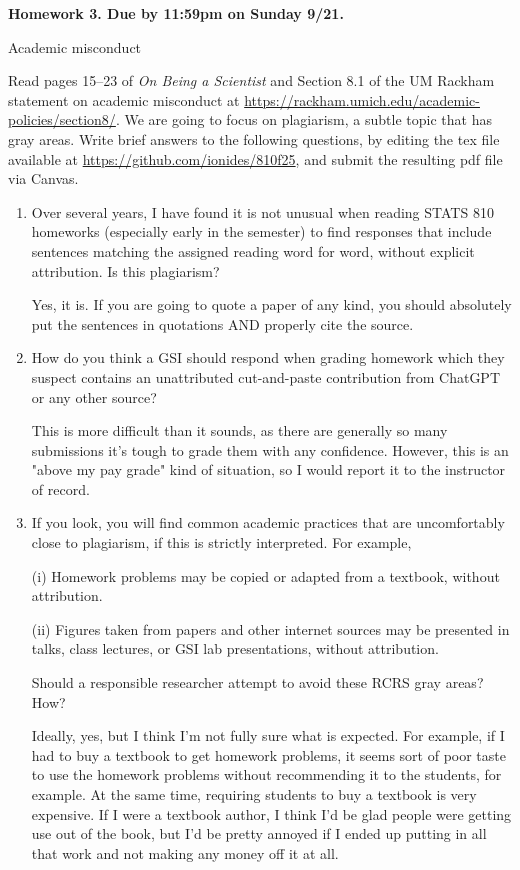 \documentclass[12pt]{article}
\begin{document}
\begin{center}\bf
Homework 3. Due by 11:59pm on Sunday 9/21.

Academic misconduct

\end{center}
Read pages 15--23 of {\em On Being a Scientist} and Section 8.1 of the UM Rackham statement on academic misconduct at \url{https://rackham.umich.edu/academic-policies/section8/}. We are going to focus on plagiarism, a subtle topic that has gray areas. Write brief answers to the following questions, by editing the tex file available at \url{https://github.com/ionides/810f25}, and submit the resulting pdf file via Canvas. 

\begin{enumerate}

\item Over several years, I have found it is not unusual when reading STATS 810 homeworks (especially early in the semester) to find responses that include sentences matching the assigned reading word for word, without explicit attribution. Is this plagiarism?

Yes, it is. If you are going to quote a paper of any kind, you should absolutely put the sentences in quotations AND properly cite the source.

\item How do you think a GSI should respond when grading homework which they suspect contains an unattributed cut-and-paste contribution from ChatGPT or any other source?

This is more difficult than it sounds, as there are generally so many submissions it's tough to grade them with any confidence. However, this 
is an "above my pay grade" kind of situation, so I would report it 
to the instructor of record.

\item If you look, you will find common academic practices that are uncomfortably close to plagiarism, if this is strictly interpreted. For example,

(i) Homework problems may be copied or adapted from a textbook, without attribution.

(ii) Figures taken from papers and other internet sources may be presented in talks, class lectures, or GSI lab presentations, without attribution.

Should a responsible researcher attempt to avoid these RCRS gray areas? How?

Ideally, yes, but I think I'm not fully sure what is expected. For example,
if I had to buy a textbook to get homework problems, it seems sort of poor taste to use the homework problems without recommending it to the students,
for example. At the same time, requiring students to buy a textbook is very
expensive. If I were a textbook author, I think I'd be glad people were getting use out of the book, but I'd be pretty annoyed if I ended up
putting in all that work and not making any money off it at all.


\end{enumerate}
\end{document}
